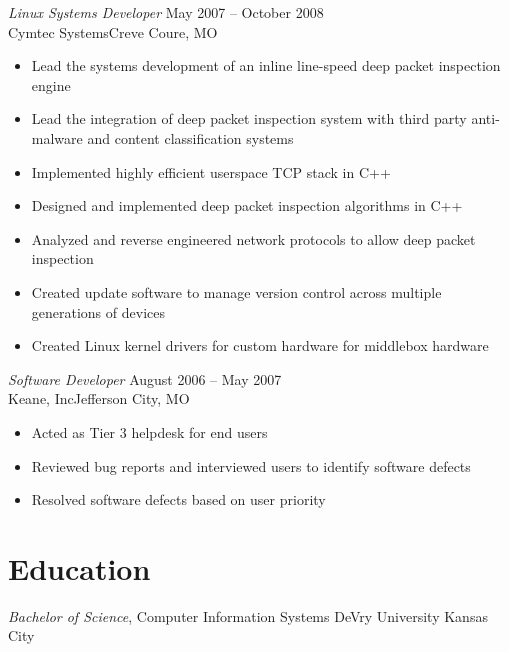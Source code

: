 \documentclass[margin,line]{resume}
\begin{document}
\begin{resume}
{\sl Linux Systems Developer} \hfill
May 2007 -- October 2008\\
Cymtec Systems\hfill  Creve Coure, MO
\begin{itemize} \itemsep -2pt %
\small\item Lead the systems development of an inline line-speed deep packet
    inspection engine
\small\item Lead the integration of deep packet inspection system with third
    party anti-malware and content classification systems
\small\item Implemented highly efficient userspace TCP stack in C++
\small\item Designed and implemented deep packet inspection algorithms in C++
\small\item Analyzed and reverse engineered network protocols to allow deep
    packet inspection
\small\item Created update software to manage version control across multiple
    generations of devices
\small\item Created Linux kernel drivers for custom hardware for middlebox
    hardware 
\end{itemize}

{\sl Software Developer} \hfill
August 2006 -- May 2007\\
Keane, Inc\hfill  Jefferson City, MO
\begin{itemize} \itemsep -2pt %
\small\item Acted as Tier 3 helpdesk for end users
\small\item Reviewed bug reports and interviewed users to identify software
    defects
\small\item Resolved software defects based on user priority
\end{itemize}

\section{Education}
{\small
  {\sl Bachelor of Science}, Computer Information Systems \hfill
  DeVry University Kansas City\hfill
}

\end{resume}
\end{document}
